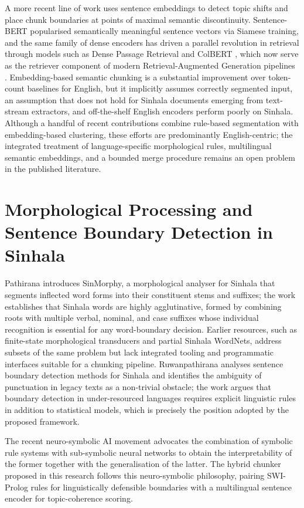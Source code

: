 \documentclass[12pt,a4paper,oneside]{report}
\begin{document}
A more recent line of work uses sentence embeddings to detect topic shifts and place chunk boundaries at points of maximal semantic discontinuity. Sentence-BERT \cite{reimers2019sbert} popularised semantically meaningful sentence vectors via Siamese training, and the same family of dense encoders has driven a parallel revolution in retrieval through models such as Dense Passage Retrieval \cite{karpukhin2020dpr} and ColBERT \cite{khattab2020colbert}, which now serve as the retriever component of modern Retrieval-Augmented Generation pipelines \cite{lewis2020rag}. Embedding-based semantic chunking is a substantial improvement over token-count baselines for English, but it implicitly assumes correctly segmented input, an assumption that does not hold for Sinhala documents emerging from text-stream extractors, and off-the-shelf English encoders perform poorly on Sinhala. Although a handful of recent contributions combine rule-based segmentation with embedding-based clustering, these efforts are predominantly English-centric; the integrated treatment of language-specific morphological rules, multilingual semantic embeddings, and a bounded merge procedure remains an open problem in the published literature.

\section{Morphological Processing and Sentence Boundary Detection in Sinhala}
\label{sec:lit-morphology}
Pathirana \cite{pathirana2025sinmorphy} introduces SinMorphy, a morphological analyser for Sinhala that segments inflected word forms into their constituent stems and suffixes; the work establishes that Sinhala words are highly agglutinative, formed by combining roots with multiple verbal, nominal, and case suffixes whose individual recognition is essential for any word-boundary decision. Earlier resources, such as finite-state morphological transducers and partial Sinhala WordNets, address subsets of the same problem but lack integrated tooling and programmatic interfaces suitable for a chunking pipeline. Ruwanpathirana \cite{ruwanpathirana2015sentence} analyses sentence boundary detection methods for Sinhala and identifies the ambiguity of punctuation in legacy texts as a non-trivial obstacle; the work argues that boundary detection in under-resourced languages requires explicit linguistic rules in addition to statistical models, which is precisely the position adopted by the proposed framework.

The recent neuro-symbolic AI movement \cite{garcez2022neurosymbolic} advocates the combination of symbolic rule systems with sub-symbolic neural networks to obtain the interpretability of the former together with the generalisation of the latter. The hybrid chunker proposed in this research follows this neuro-symbolic philosophy, pairing SWI-Prolog rules for linguistically defensible boundaries with a multilingual sentence encoder for topic-coherence scoring.
\end{document}
